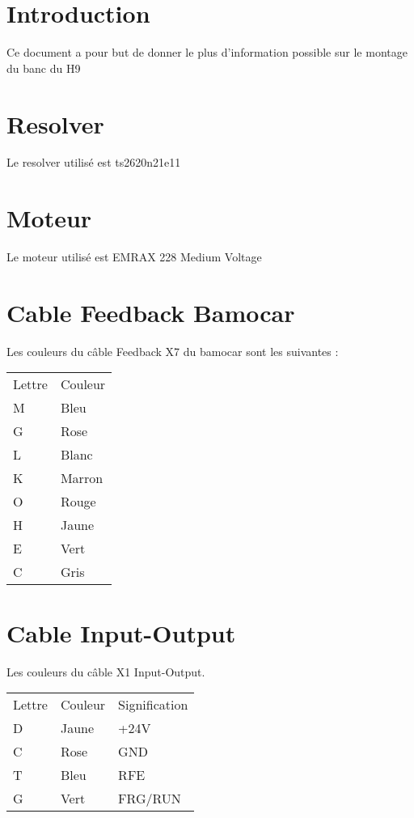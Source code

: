 \documentclass{EPSA-rap-template}
\begin{document}
\fairepagedegarde
\newpage
\tableofcontents

\section{Introduction}

Ce document a pour but de donner le plus d'information possible sur le montage du banc du H9

\section{Resolver}

Le resolver utilisé est ts2620n21e11 

\section{Moteur}

Le moteur utilisé est EMRAX 228 Medium Voltage


\section{Cable Feedback Bamocar}

Les couleurs du câble Feedback X7 du bamocar sont les suivantes : 

\begin{tabular}{ll}

Lettre & Couleur \\
M & Bleu \\
G & Rose \\
L & Blanc \\
K & Marron \\
O & Rouge \\
H & Jaune \\
E & Vert \\
C & Gris \\

\end{tabular}

\section{Cable Input-Output}

Les couleurs du câble X1 Input-Output.

\begin{tabular}{lll}

Lettre & Couleur & Signification \\
D & Jaune & +24V \\
C & Rose & GND \\
T & Bleu & RFE \\
G & Vert & FRG/RUN \\

\end{tabular}
\end{document}
